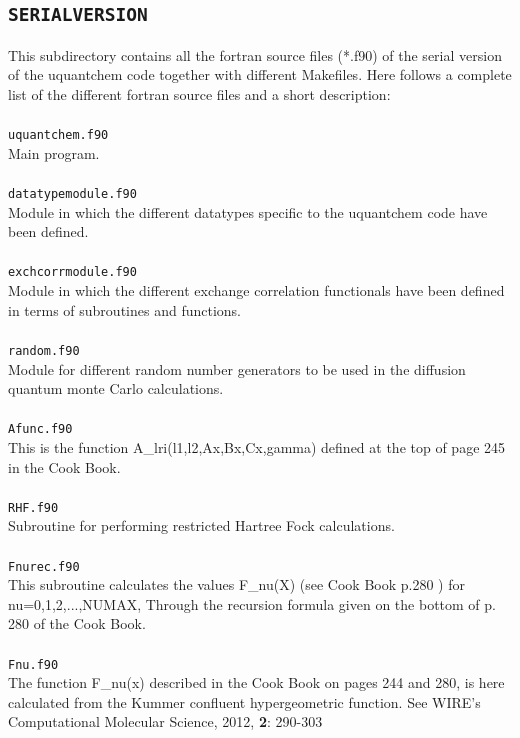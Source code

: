 \documentclass[a4paper,twoside,openany]{book}
\begin{document}
{{\subsection{\texttt{SERIALVERSION}}
This subdirectory contains all the fortran source files (*.f90) of the serial version of the uquantchem code together with different Makefiles. Here follows a complete list of the different fortran source files 
and a short description: \\ \\
\texttt{uquantchem.f90}\\
Main program. \\ \\
\texttt{datatypemodule.f90}\\
Module in which the different datatypes specific to the uquantchem code have been defined. \\ \\
\texttt{exchcorrmodule.f90} \\
Module in which the different exchange correlation functionals have been defined in terms of subroutines and functions.\\ \\
\texttt{random.f90}\\
Module for different random number generators to be used in the diffusion quantum monte Carlo calculations.\\ \\
\texttt{Afunc.f90} \\
This is the function A\_lri(l1,l2,Ax,Bx,Cx,gamma) defined
at the top of page 245 in the Cook Book.\cite{Cook} \\ \\
\texttt{RHF.f90}\\
Subroutine for performing restricted Hartree Fock calculations. \\ \\
\texttt{Fnurec.f90}\\
This subroutine calculates the values F\_nu(X) (see Cook Book p.280 ) \cite{Cook} for nu=0,1,2,...,NUMAX, Through the recursion formula
given on the bottom of p. 280 of the Cook Book. \\ \\
\texttt{Fnu.f90}\\
The function F\_nu(x) described in the Cook Book \cite{Cook}
on pages 244 and 280, is here calculated from 
the Kummer confluent hypergeometric function.
See WIRE's Computational Molecular Science, 2012, {\bf 2}: 290-303 \\ \\
}}
\end{document}

